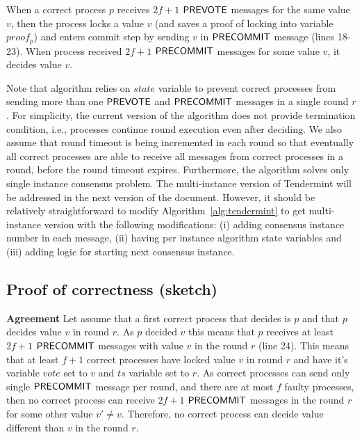 When a correct process $p$ receives $2f+1$ $\mathsf{PREVOTE}$ messages for the same value $v$, then the process locks a value $v$ (and saves a proof of locking into variable $proof_p$) and enters commit step by sending $v$ in $\mathsf{PRECOMMIT}$   message (lines 18-23). When process received $2f+1$ $\mathsf{PRECOMMIT}$   messages for some value $v$, it decides value $v$. 

Note that algorithm relies on $state$ variable to prevent correct processes from sending more than one $\mathsf{PREVOTE}$ and $\mathsf{PRECOMMIT}$ messages in a single round $r$. For simplicity, the current version of the algorithm does not provide termination condition, i.e., processes continue round execution even after deciding. We also assume that round timeout is being incremented in each round so that eventually all correct processes are able to receive all messages from correct processes in a round, before the round timeout expires.  
Furthermore, the algorithm solves only single instance consensus problem. The multi-instance version of Tendermint will be addressed in the next version of the document. However, it should be relatively straightforward to modify Algorithm~\ref{alg:tendermint} to get multi-instance version with the following modifications: (i) adding consensus instance number in each message, (ii) having per instance algorithm state variables and (iii) adding logic for starting next consensus instance.

\subsection{Proof of correctness (sketch)}

\textbf{Agreement} Let assume that a first correct process that decides is $p$ and that $p$ decides value $v$ in round $r$. As $p$ decided $v$ this means that $p$ receives at least $2f+1$ $\mathsf{PRECOMMIT}$  messages with value $v$ in the round $r$ (line 24). This means that at least $f+1$ correct processes have locked value $v$ in round $r$ and have it's variable $vote$ set to $v$ and $ts$ variable set to $r$. As correct processes can send only single $\mathsf{PRECOMMIT}$  message per round, and there are at most $f$ faulty processes, then no correct process can receive $2f+1$ $\mathsf{PRECOMMIT}$  messages in the round $r$ for some other value $v' \neq v$. Therefore, no correct process can decide value different than $v$ in the round $r$. 


